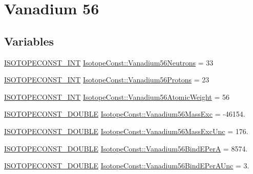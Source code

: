 \hypertarget{group___isotope_const-_vanadium-_v56}{}\section{Vanadium 56}
\label{group___isotope_const-_vanadium-_v56}
\subsection*{Variables}
\begin{DoxyCompactItemize}
\item 
\mbox{\hyperlink{group___isotope_const-_macros_ga5f18360b3e99483a35c32d789e62621c}{I\+S\+O\+T\+O\+P\+E\+C\+O\+N\+S\+T\+\_\+\+I\+NT}} \mbox{\hyperlink{group___isotope_const-_vanadium-_v56_gac1e7255ab501c792c7fad71a4effc423}{Isotope\+Const\+::\+Vanadium56\+Neutrons}} = 33
\item 
\mbox{\hyperlink{group___isotope_const-_macros_ga5f18360b3e99483a35c32d789e62621c}{I\+S\+O\+T\+O\+P\+E\+C\+O\+N\+S\+T\+\_\+\+I\+NT}} \mbox{\hyperlink{group___isotope_const-_vanadium-_v56_gaecdc31807c041fb4bf9c91450fb6db36}{Isotope\+Const\+::\+Vanadium56\+Protons}} = 23
\item 
\mbox{\hyperlink{group___isotope_const-_macros_ga5f18360b3e99483a35c32d789e62621c}{I\+S\+O\+T\+O\+P\+E\+C\+O\+N\+S\+T\+\_\+\+I\+NT}} \mbox{\hyperlink{group___isotope_const-_vanadium-_v56_gaf8926a4d003ce58c6225087fbe4c8455}{Isotope\+Const\+::\+Vanadium56\+Atomic\+Weight}} = 56
\item 
\mbox{\hyperlink{group___isotope_const-_macros_ga8f45a7272ce02c0b4c65c44636ed719a}{I\+S\+O\+T\+O\+P\+E\+C\+O\+N\+S\+T\+\_\+\+D\+O\+U\+B\+LE}} \mbox{\hyperlink{group___isotope_const-_vanadium-_v56_ga58405f0a8866e5fd7df261b26d9b47e0}{Isotope\+Const\+::\+Vanadium56\+Mass\+Exc}} = -\/46154.
\item 
\mbox{\hyperlink{group___isotope_const-_macros_ga8f45a7272ce02c0b4c65c44636ed719a}{I\+S\+O\+T\+O\+P\+E\+C\+O\+N\+S\+T\+\_\+\+D\+O\+U\+B\+LE}} \mbox{\hyperlink{group___isotope_const-_vanadium-_v56_ga6eb112b93662b2088e09fabdb2475e44}{Isotope\+Const\+::\+Vanadium56\+Mass\+Exc\+Unc}} = 176.
\item 
\mbox{\hyperlink{group___isotope_const-_macros_ga8f45a7272ce02c0b4c65c44636ed719a}{I\+S\+O\+T\+O\+P\+E\+C\+O\+N\+S\+T\+\_\+\+D\+O\+U\+B\+LE}} \mbox{\hyperlink{group___isotope_const-_vanadium-_v56_ga99c21769d136260cfefc479cd06f606d}{Isotope\+Const\+::\+Vanadium56\+Bind\+E\+PerA}} = 8574.
\item 
\mbox{\hyperlink{group___isotope_const-_macros_ga8f45a7272ce02c0b4c65c44636ed719a}{I\+S\+O\+T\+O\+P\+E\+C\+O\+N\+S\+T\+\_\+\+D\+O\+U\+B\+LE}} \mbox{\hyperlink{group___isotope_const-_vanadium-_v56_gaf371d2c6a920fea8f26af5fb39a7ac52}{Isotope\+Const\+::\+Vanadium56\+Bind\+E\+Per\+A\+Unc}} = 3.

\end{DoxyCompactItemize}
